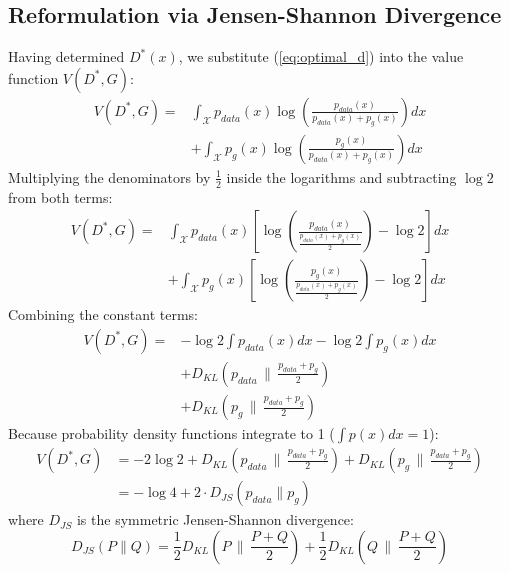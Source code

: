 \documentclass[conference]{IEEEtran}
\begin{document}
\subsection{Reformulation via Jensen-Shannon Divergence}
Having determined $D^*(x)$, we substitute (\ref{eq:optimal_d}) into the value function $V(D^*, G)$:
\begin{align}
V(D^*, G) = &\int_{\mathcal{X}} p_{data}(x) \log \left( \frac{p_{data}(x)}{p_{data}(x) + p_g(x)} \right) dx \nonumber \\
&+ \int_{\mathcal{X}} p_g(x) \log \left( \frac{p_g(x)}{p_{data}(x) + p_g(x)} \right) dx
\end{align}
Multiplying the denominators by $\frac{1}{2}$ inside the logarithms and subtracting $\log 2$ from both terms:
\begin{align}
V(D^*, G) = &\int_{\mathcal{X}} p_{data}(x) \left[ \log \left( \frac{p_{data}(x)}{\frac{p_{data}(x) + p_g(x)}{2}} \right) - \log 2 \right] dx \nonumber \\
&+ \int_{\mathcal{X}} p_g(x) \left[ \log \left( \frac{p_g(x)}{\frac{p_{data}(x) + p_g(x)}{2}} \right) - \log 2 \right] dx
\end{align}
Combining the constant terms:
\begin{align}
V(D^*, G) = &-\log 2 \int p_{data}(x) dx - \log 2 \int p_g(x) dx \nonumber \\
&+ D_{KL}\left( p_{data} \,\Big\|\, \frac{p_{data} + p_g}{2} \right) \nonumber \\
&+ D_{KL}\left( p_g \,\Big\|\, \frac{p_{data} + p_g}{2} \right)
\end{align}
Because probability density functions integrate to 1 ($\int p(x) dx = 1$):
\begin{align}
V(D^*, G) &= -2 \log 2 + D_{KL}\left( p_{data} \,\Big\|\, \frac{p_{data} + p_g}{2} \right) + D_{KL}\left( p_g \,\Big\|\, \frac{p_{data} + p_g}{2} \right) \nonumber \\
&= -\log 4 + 2 \cdot D_{JS}(p_{data} \parallel p_g)
\label{eq:v_jsd}
\end{align}
where $D_{JS}$ is the symmetric Jensen-Shannon divergence:
\begin{equation}
D_{JS}(P \parallel Q) = \frac{1}{2} D_{KL}\left(P \,\Big\|\, \frac{P+Q}{2}\right) + \frac{1}{2} D_{KL}\left(Q \,\Big\|\, \frac{P+Q}{2}\right)
\end{equation}
\end{document}

